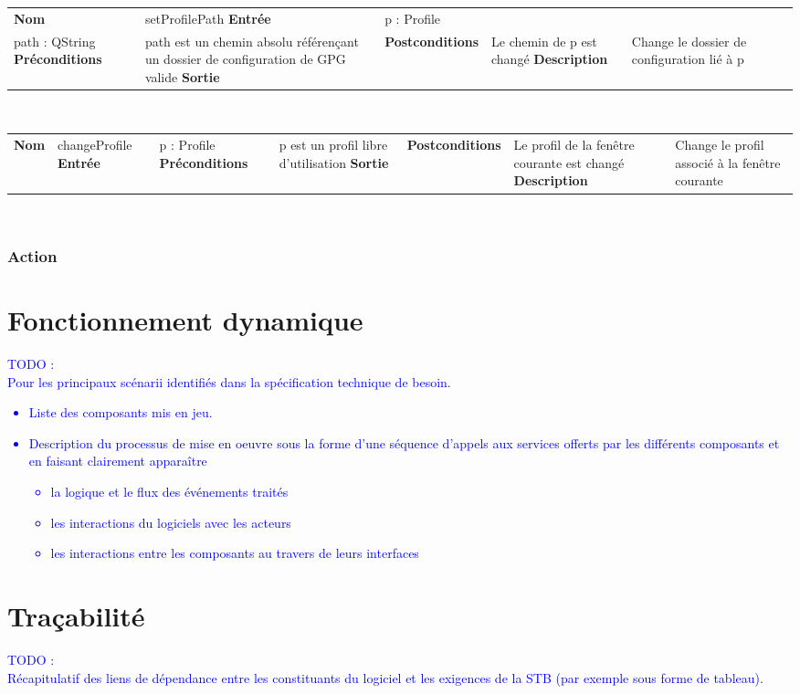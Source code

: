 \documentclass{../res/univ-projet}
\newcommand{\methode}[6]{
  \begin{tabular}{|>{\centering}p{2.5cm}|>{\centering}p{7cm}|}
    \hline
    \color{white}\cellcolor{blue_saphir}\bfseries{Nom}&
    #1 \cr
    \hline
    \color{white}\cellcolor{blue_saphir}\bfseries{Entrée}&
    #2 \cr
    \hline
    \color{white}\cellcolor{blue_saphir}\bfseries{Préconditions}&
    #3 \cr
    \hline
    \color{white}\cellcolor{blue_saphir}\bfseries{Sortie}&
    #4 \cr
    \hline
    \color{white}\cellcolor{blue_saphir}\bfseries{Postconditions}&
    #5 \cr
    \hline
    \color{white}\cellcolor{blue_saphir}\bfseries{Description}&
    #6 \cr
    \hline
  \end{tabular}\\
}
\begin{document}
        \methode
        {setProfilePath}
        {p : Profile\\path : QString}
        {path est un chemin absolu référençant un dossier de configuration de GPG valide}
        {}
        {Le chemin de p est changé}{Change le dossier de configuration lié à p}
        
        \methode{changeProfile}{p : Profile}{p est un profil libre d'utilisation}{}{Le profil de la fenêtre courante est changé}{Change le profil associé à la fenêtre courante}
      \subsubsection{Action}
\section{Fonctionnement dynamique} %
\label{sec:fonctionnement_dynamique}

  \textcolor{blue}{
    TODO : \\
    Pour les principaux scénarii identifiés dans la spécification technique de besoin.
    \begin{itemize}
      \item Liste des composants mis en jeu.
      \item Description du processus de mise en oeuvre sous la forme d'une
      séquence d'appels aux services offerts par les différents composants et en faisant
      clairement apparaître
      \begin{itemize}
        \item la logique et le flux des événements traités
        \item les interactions du logiciels avec les acteurs
        \item les interactions entre les composants au travers de leurs interfaces
      \end{itemize}
    \end{itemize}
  }

\section{Traçabilité} %
\label{sec:tra_abilit_}

  \textcolor{blue}{
    TODO : \\
    Récapitulatif des liens de dépendance entre les constituants du logiciel et les exigences de
    la STB (par exemple sous forme de tableau).
  }

\end{document}
